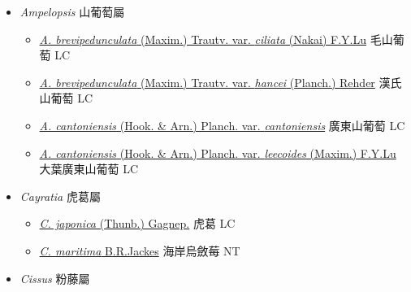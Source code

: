 
  \begin{itemize}
 \item[] \textit{Ampelopsis} 山葡萄屬
                    
  \begin{itemize}
        \item[] \href{http://www.theplantlist.org/tpl1.1/search?q=Ampelopsis+brevipedunculata+var.+ciliata}{\textit{A. brevipedunculata} (Maxim.) Trautv. var. \textit{ciliata} (Nakai) F.Y.Lu}   毛山葡萄 LC
        \item[] \href{http://www.theplantlist.org/tpl1.1/search?q=Ampelopsis+brevipedunculata+var.+hancei}{\textit{A. brevipedunculata} (Maxim.) Trautv. var. \textit{hancei} (Planch.) Rehder}   漢氏山葡萄 LC
        \item[] \href{http://www.theplantlist.org/tpl1.1/search?q=Ampelopsis+cantoniensis+var.+cantoniensis}{\textit{A. cantoniensis} (Hook. \& Arn.) Planch. var. \textit{cantoniensis}}   廣東山葡萄 LC
        \item[] \href{http://www.theplantlist.org/tpl1.1/search?q=Ampelopsis+cantoniensis+var.+leecoides}{\textit{A. cantoniensis} (Hook. \& Arn.) Planch. var. \textit{leecoides} (Maxim.) F.Y.Lu}   大葉廣東山葡萄 LC
  \end{itemize}
 \item[] \textit{Cayratia} 虎葛屬
                    
  \begin{itemize}
        \item[] \href{http://www.theplantlist.org/tpl1.1/search?q=Cayratia+japonica}{\textit{C. japonica} (Thunb.) Gagnep.}   虎葛 LC
        \item[] \href{http://www.theplantlist.org/tpl1.1/search?q=Cayratia+maritima}{\textit{C. maritima} B.R.Jackes}   海岸烏斂莓 NT
  \end{itemize}
 \item[] \textit{Cissus} 粉藤屬
                    

\end{itemize}
